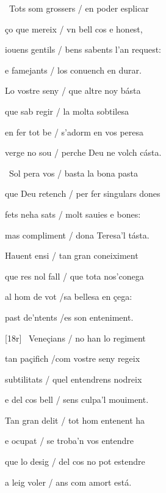 \documentclass[12pt]{article}
\begin{document}
\begin{estrofa}

 \textparagraph\  Tots som grossers / en poder esplicar

 \c{c}o que mereix / vn bell cos e honest,

 iouens gentils / bens sabents l'an request:

 e famejants / los conuench en durar.

 Lo vostre seny / que altre noy b\'{a}sta

 que sab regir / la molta sobtilesa

 en fer tot be / s'adorm en vos peresa

 verge no sou / perche Deu ne volch c\'{a}sta.

\end{estrofa}



\begin{estrofa}

 \textparagraph\  Sol pera vos / basta la bona pasta

 que Deu retench / per fer singulars dones

 fets neha sats / molt sauies e bones:

 mas compliment / dona Teresa'l t\'{a}sta.

 Hauent ensi / tan gran coneiximent

 que res nol fall / que tota nos'conega

 al hom de vot /sa bellesa en \c{c}ega:

 past de'ntents /es son enteniment.

\end{estrofa}



\begin{estrofa}

 [18r] \textparagraph\  Vene\c{c}ians / no han lo regiment

 tan pa\c{c}ifich /com vostre seny regeix

 subtilitats / quel entendrens nodreix

 e del cos bell / sens culpa'l mouiment.

 Tan gran delit / tot hom entenent ha

 e ocupat / se troba'n vos entendre

 que lo desig / del cos no pot estendre

 a leig voler / ans com amort est\'{a}.

\end{estrofa}
\end{document}
